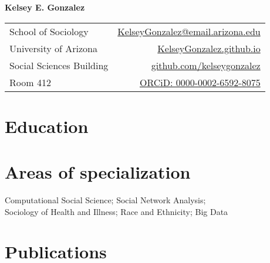 \documentclass[11pt]{article} %
\begin{document}

{\LARGE\bfseries Kelsey E. Gonzalez} %
\bigskip\bigskip\medskip %
\medskip %



\begin{tabular}{lr}
School of Sociology & 
\href{mailto:KelseyGonzalez@email.arizona.edu}{KelseyGonzalez@email.arizona.edu}
\\
University of Arizona & 
\href{kelseygonzalez.github.io}{KelseyGonzalez.github.io}
\\ 
Social Sciences Building & 
\href{https://github.com/kelseygonzalez}{github.com/kelseygonzalez}
\\
Room 412 & 
\href{https://orcid.org/0000-0002-6592-8075}{ORCiD: 0000-0002-6592-8075}
\\
\end{tabular}

\vspace{0.04\textheight} %


\section*{Education}



\section*{Areas of specialization}
Computational Social Science; Social Network Analysis; \\
Sociology of Health and Illness; Race and Ethnicity; Big Data



\section*{Publications}


\end{document}
